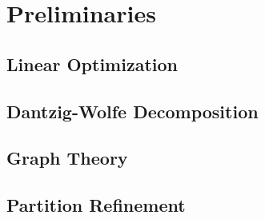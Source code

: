 \chapter{Preliminaries}

	\section{Linear Optimization}
	
	\section{Dantzig-Wolfe Decomposition}
	
	\section{Graph Theory}
	
	\section{Partition Refinement}
